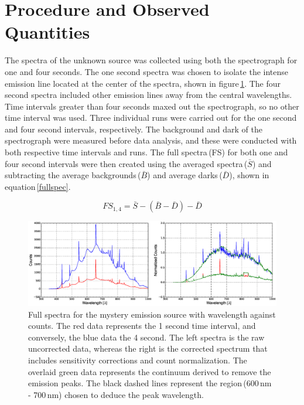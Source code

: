 \documentclass[twocolumn]{aastex6}
\begin{document}
\section{Procedure and Observed Quantities}

The spectra of the unknown source was collected using both the spectrograph for one and four seconds. The one second spectra was chosen to isolate the intense emission line located at the center of the spectra, shown in figure\,\ref{counts}. The four second spectra included other emission lines away from the central wavelengths. Time intervals greater than four seconds maxed out the spectrograph, so no other time interval was used. Three individual runs were carried out for the one second and four second intervals, respectively. The background and dark of the spectrograph were measured before data analysis, and these were conducted with both respective time intervals and runs. The full spectra\,(FS) for both one and four second intervals were then created using the averaged spectra\,($\bar{S}$) and subtracting the average backgrounds\,($\bar{B}$) and average darks\,($\bar{D}$), shown in equation\,\ref{fullspec}.

\begin{equation}
FS_{1,4} = \bar{S} - (\bar{B} - \bar{D}) - \bar{D}
\label{fullspec}
\end{equation}

\begin{figure}[ht]
  \centering
  \includegraphics[scale=0.4]{counts.eps}%
  \caption{Full spectra for the mystery emission source with wavelength against counts. The red data represents the 1 second time interval, and conversely, the blue data the 4 second. The left spectra is the raw uncorrected data, whereas the right is the corrected spectrum that includes sensitivity corrections and count normalization. The overlaid green data represents the continuum derived to remove the emission peaks. The black dashed lines represent the region\,(600\,nm - 700\,nm) chosen to deduce the peak wavelength.}
  \label{counts}
\end{figure}
\end{document}
